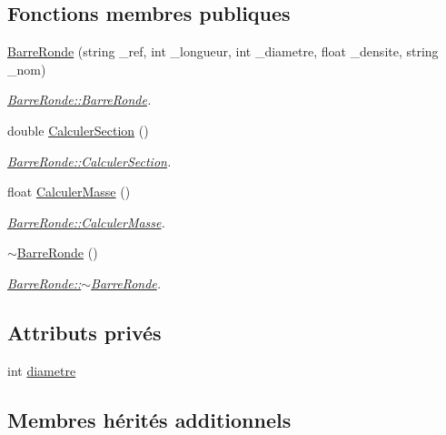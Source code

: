 \subsection*{Fonctions membres publiques}
\begin{DoxyCompactItemize}
\item 
\hyperlink{class_barre_ronde_a71f08d5ff38305f39ed7d6205941ec3e}{Barre\+Ronde} (string \+\_\+ref, int \+\_\+longueur, int \+\_\+diametre, float \+\_\+densite, string \+\_\+nom)
\begin{DoxyCompactList}\small\item\em \hyperlink{class_barre_ronde_a71f08d5ff38305f39ed7d6205941ec3e}{Barre\+Ronde\+::\+Barre\+Ronde}. \end{DoxyCompactList}\item 
double \hyperlink{class_barre_ronde_adc6f65b51c7ca244fb29f2ed4b9a6f91}{Calculer\+Section} ()
\begin{DoxyCompactList}\small\item\em \hyperlink{class_barre_ronde_adc6f65b51c7ca244fb29f2ed4b9a6f91}{Barre\+Ronde\+::\+Calculer\+Section}. \end{DoxyCompactList}\item 
float \hyperlink{class_barre_ronde_a450c58e2bfcb1300339f1c790740e5ad}{Calculer\+Masse} ()
\begin{DoxyCompactList}\small\item\em \hyperlink{class_barre_ronde_a450c58e2bfcb1300339f1c790740e5ad}{Barre\+Ronde\+::\+Calculer\+Masse}. \end{DoxyCompactList}\item 
\hyperlink{class_barre_ronde_aa62c3c350d2153aefcab64a20a6a795a}{$\sim$\+Barre\+Ronde} ()
\begin{DoxyCompactList}\small\item\em \hyperlink{class_barre_ronde_aa62c3c350d2153aefcab64a20a6a795a}{Barre\+Ronde\+::$\sim$\+Barre\+Ronde}. \end{DoxyCompactList}\end{DoxyCompactItemize}
\subsection*{Attributs privés}
\begin{DoxyCompactItemize}
\item 
int \hyperlink{class_barre_ronde_a2ad361c8aefdf0f7b25bbcbc1ec4c4ca}{diametre}
\end{DoxyCompactItemize}
\subsection*{Membres hérités additionnels}


